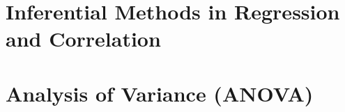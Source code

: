 \documentclass{article}\usepackage[]{graphicx}\usepackage[]{color}
\begin{document}
\subsection{}



\subsection{}



\section{Inferential Methods in Regression and Correlation}
\section{Analysis of Variance (ANOVA)}
\end{document}
